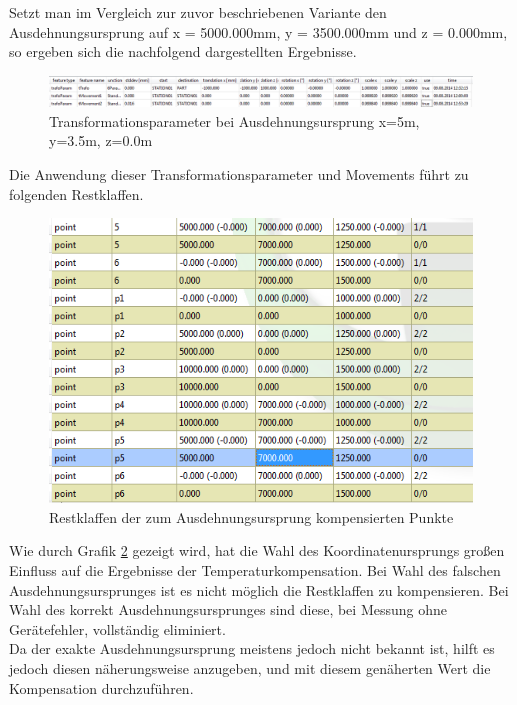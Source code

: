 Setzt man im Vergleich zur zuvor beschriebenen Variante den Ausdehnungsursprung auf x = 5000.000mm, y = 3500.000mm und z = 0.000mm, so ergeben sich die nachfolgend dargestellten Ergebnisse.
\begin{figure}[h]
\label{fig:trafoparamausdehnung2ausdurspr}
\centering
	\includegraphics[scale=1.5]{bilder/Testmessung/ursprungecke/trafoParamausdehnung2ausdurspr}
	\caption{Transformationsparameter bei Ausdehnungsursprung x=5m, y=3.5m, z=0.0m}
\end{figure}

Die Anwendung dieser Transformationsparameter und Movements führt zu folgenden Restklaffen.

\begin{figure}[H]
\label{fig:koordausdehnung2ausdurspr}
\centering
	\includegraphics[scale=2.0]{bilder/Testmessung/ursprungecke/koordsausdehnung2ausdurspr}
	\caption{Restklaffen der zum Ausdehnungsursprung kompensierten Punkte}
\end{figure}

Wie durch Grafik \ref{fig:koordausdehnung2ausdurspr} gezeigt wird, hat die Wahl des Koordinatenursprungs großen Einfluss auf die Ergebnisse der Temperaturkompensation. Bei Wahl des falschen Ausdehnungsursprunges ist es nicht möglich die Restklaffen zu kompensieren. Bei Wahl des korrekt Ausdehnungsursprunges sind diese, bei Messung ohne Gerätefehler, vollständig eliminiert.\\
Da der exakte Ausdehnungsursprung meistens jedoch nicht bekannt ist, hilft es jedoch diesen näherungsweise anzugeben, und mit diesem genäherten Wert die Kompensation durchzuführen.\\

